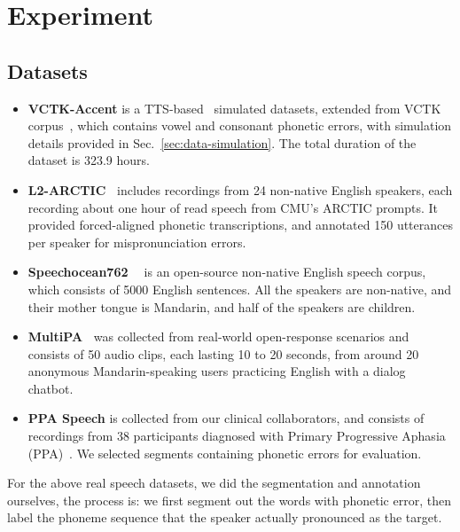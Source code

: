 \section{Experiment}

\subsection{Datasets}
\begin{itemize}

\item \textbf{VCTK-Accent} is a TTS-based~\cite{zhou24eyolostutter} simulated datasets, extended from VCTK corpus~\cite{yamagishi2019cstr-vctk}, which contains vowel and consonant phonetic errors, with simulation details provided in Sec.~\ref{sec:data-simulation}. The total duration of the dataset is 323.9 hours.


\item \textbf{L2-ARCTIC~\cite{zhao18L2Arctic}} 
includes recordings from 24 non-native English speakers, each recording about one hour of read speech from CMU’s ARCTIC prompts. It provided forced-aligned phonetic transcriptions, and annotated 150 utterances per speaker for mispronunciation errors.

\item \textbf{Speechocean762 ~\cite{zhang21speechocean}} is an open-source non-native English speech corpus, which consists of 5000 English sentences. All the speakers are non-native, and their mother tongue is Mandarin, and half of the speakers are children.

\item \textbf{MultiPA~\cite{chen24multipa}} was collected from real-world open-response scenarios and consists of 50 audio clips, each lasting 10 to 20 seconds, from around 20 anonymous Mandarin-speaking users practicing English with a dialog chatbot.



\item \textbf{PPA Speech} is collected from our clinical collaborators, and consists of recordings from 38 participants diagnosed with Primary Progressive Aphasia (PPA)~\cite{gorno2011classification-ppa}. We selected segments containing phonetic errors for evaluation.
\end{itemize}
For the above real speech datasets, we did the segmentation and annotation ourselves, the process is: we first segment out the words with phonetic error, then label the phoneme sequence that the speaker actually pronounced as the target.


